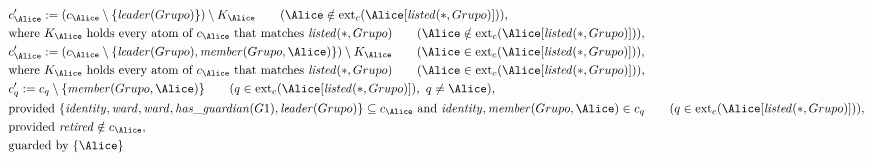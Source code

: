\begin{align*}
&
c'_
{
\Alice
}
 := 
(c_
{
\Alice
}
 \setminus 
\{
\mathit{\detokenize{
leader
}}
(
Grupo
)
\}
) \setminus K_
{
\Alice
}
 \qquad (
\Alice
 \notin 
\mathrm{ext}_c(
\Alice
[
\mathit{\detokenize{
listed
}}
(
\ast
,
Grupo
)
]
)
)
,\\
&
\text{where } K_
{
\Alice
}
 \text{ holds every atom of } c_
{
\Alice
}
 \text{ that matches } 
\mathit{\detokenize{
listed
}}
(
\ast
,
Grupo
)
 \qquad (
\Alice
 \notin 
\mathrm{ext}_c(
\Alice
[
\mathit{\detokenize{
listed
}}
(
\ast
,
Grupo
)
]
)
)
,\\
&
c'_
{
\Alice
}
 := 
(c_
{
\Alice
}
 \setminus 
\{
\mathit{\detokenize{
leader
}}
(
Grupo
)
,
\mathit{\detokenize{
member
}}
(
Grupo
,
\Alice
)
\}
) \setminus K_
{
\Alice
}
 \qquad (
\Alice
 \in 
\mathrm{ext}_c(
\Alice
[
\mathit{\detokenize{
listed
}}
(
\ast
,
Grupo
)
]
)
)
,\\
&
\text{where } K_
{
\Alice
}
 \text{ holds every atom of } c_
{
\Alice
}
 \text{ that matches } 
\mathit{\detokenize{
listed
}}
(
\ast
,
Grupo
)
 \qquad (
\Alice
 \in 
\mathrm{ext}_c(
\Alice
[
\mathit{\detokenize{
listed
}}
(
\ast
,
Grupo
)
]
)
)
,\\
&
c'_
q
 := 
c_
q
 \setminus 
\{
\mathit{\detokenize{
member
}}
(
Grupo
,
\Alice
)
\}
 \qquad (
q
 \in 
\mathrm{ext}_c(
\Alice
[
\mathit{\detokenize{
listed
}}
(
\ast
,
Grupo
)
]
)
,\ 
q \neq 
\Alice
)
,\\
&
\text{provided } 
\{
\mathit{\detokenize{
identity
}}
,
\mathit{\detokenize{
ward
}}
,
\mathit{\detokenize{
ward
}}
,
\mathit{\detokenize{
has_guardian
}}
(
G1
)
,
\mathit{\detokenize{
leader
}}
(
Grupo
)
\}
 \subseteq c_
{
\Alice
}
 \text{ and } 
\mathit{\detokenize{
identity
}}
,
\mathit{\detokenize{
member
}}
(
Grupo
,
\Alice
)
 \in c_
q
 \qquad (
q \in 
\mathrm{ext}_c(
\Alice
[
\mathit{\detokenize{
listed
}}
(
\ast
,
Grupo
)
]
)
)
,\\
&
\text{provided } 
\mathit{\detokenize{
retired
}}
 \notin c_
{
\Alice
}
,\\
&
\text{guarded by } \{
\Alice
\}
\end{align*}

